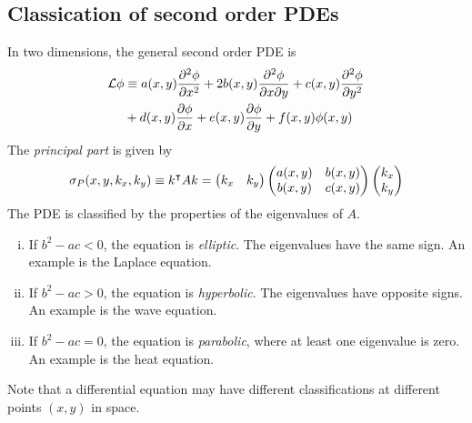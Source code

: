 \subsection{Classication of second order PDEs}
In two dimensions, the general second order PDE is
\begin{align*}
	\mathcal L \phi & \equiv a(x,y) \pdv[2]{\phi}{x} + 2 b(x,y) \pdv{\phi}{x}{y} + c(x,y) \pdv[2]{\phi}{y} \\
	                & + d(x,y) \pdv{\phi}{x} + e(x,y) \pdv{\phi}{y} + f(x,y) \phi(x,y)
\end{align*}
The \textit{principal part} is given by
\[
	\sigma_P (x,y,k_x,k_y) \equiv k^\intercal A k = \begin{pmatrix}
		k_x & k_y
	\end{pmatrix} \begin{pmatrix}
		a(x,y) & b(x,y) \\
		b(x,y) & c(x,y)
	\end{pmatrix} \begin{pmatrix}
		k_x \\ k_y
	\end{pmatrix}
\]
The PDE is classified by the properties of the eigenvalues of \( A \).
\begin{enumerate}[(i)]
	\item If \( b^2 - ac < 0 \), the equation is \textit{elliptic}.
	      The eigenvalues have the same sign.
	      An example is the Laplace equation.
	\item If \( b^2 - ac > 0 \), the equation is \textit{hyperbolic}.
	      The eigenvalues have opposite signs.
	      An example is the wave equation.
	\item If \( b^2 - ac = 0 \), the equation is \textit{parabolic}, where at least one eigenvalue is zero.
	      An example is the heat equation.
\end{enumerate}
Note that a differential equation may have different classifications at different points \( (x,y) \) in space.

